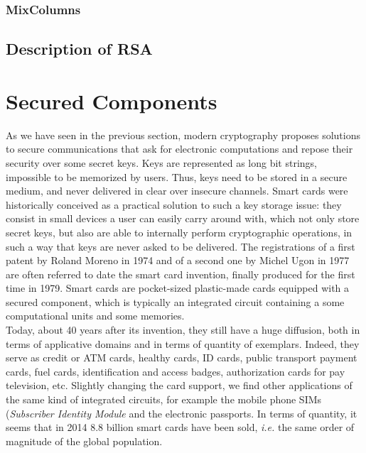 \subsubsection*{MixColumns}


\subsection{Description of RSA}


\section{Secured Components}

As we have seen in the previous section, modern cryptography proposes solutions to secure communications that ask for electronic computations and repose their security over some secret keys. Keys are represented as long bit strings, impossible to be memorized by users. Thus, keys need to be stored in a secure medium, and never delivered in clear over insecure channels. Smart cards were historically conceived as a practical solution to such a key storage issue: they consist in small devices a user can easily carry around with, which not only store secret keys, but also are able to internally perform cryptographic operations, in such a way that keys are never asked to be delivered. The registrations of a first patent by Roland Moreno in 1974 and of a second one by Michel Ugon in 1977 are often referred to date the smart card invention, finally produced for the first time in 1979. Smart cards are pocket-sized plastic-made cards equipped with a secured component, which is typically an integrated circuit containing a some computational units and some memories.\\

Today, about 40 years after its invention, they still have a huge diffusion, both in terms of applicative domains and in terms of quantity of exemplars. Indeed, they serve as credit or ATM cards, healthy cards, ID cards, public transport payment cards, fuel cards, identification and access badges, authorization cards for pay television, etc. Slightly changing the card support, we find other applications of the same kind of integrated circuits, for example the  mobile phone SIMs (\emph{Subscriber Identity Module} and the electronic passports. In terms of quantity, it seems that in 2014 8.8 billion smart cards have been sold, \emph{i.e.} the same order of magnitude of the global population. \\

